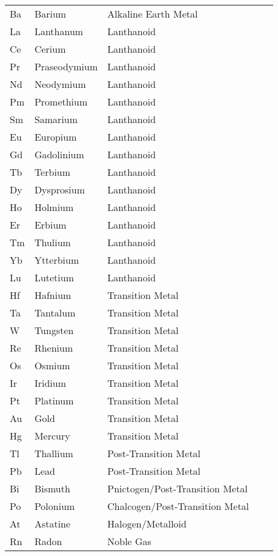 \begin{center}
\begin{longtable}{|l|l|l|l|l|}
Ba 	& Barium 		& Alkaline Earth Metal				& & \\
La 	& Lanthanum 	& Lanthanoid						& & \\
Ce 	& Cerium 		& Lanthanoid						& & \\
Pr 	& Praseodymium 	& Lanthanoid						& & \\
Nd 	& Neodymium 	& Lanthanoid						& & \\
Pm 	& Promethium	& Lanthanoid						& & \\
Sm 	& Samarium  	& Lanthanoid						& & \\
Eu 	& Europium  	& Lanthanoid						& & \\
Gd 	& Gadolinium	& Lanthanoid						& & \\
Tb 	& Terbium 		& Lanthanoid						& & \\
Dy 	& Dysprosium	& Lanthanoid						& & \\
Ho 	& Holmium   	& Lanthanoid						& & \\
Er 	& Erbium    	& Lanthanoid						& & \\
Tm 	& Thulium   	& Lanthanoid						& & \\
Yb 	& Ytterbium 	& Lanthanoid						& & \\
Lu 	& Lutetium  	& Lanthanoid						& & \\
Hf 	& Hafnium 		& Transition Metal					& & \\
Ta 	& Tantalum  	& Transition Metal					& & \\
W 	& Tungsten 		& Transition Metal					& & \\
Re 	& Rhenium 		& Transition Metal					& & \\
Os 	& Osmium 		& Transition Metal					& & \\
Ir 	& Iridium 		& Transition Metal					& & \\
Pt 	& Platinum 		& Transition Metal					& & \\
Au 	& Gold 			& Transition Metal					& & \\
Hg 	& Mercury 		& Transition Metal					& & \\
Tl 	& Thallium 		& Post-Transition Metal				& & \\
Pb 	& Lead 			& Post-Transition Metal				& & \\
Bi 	& Bismuth 		& Pnictogen/Post-Transition Metal	& & \\
Po 	& Polonium  	& Chalcogen/Post-Transition Metal	& & \\
At 	& Astatine  	& Halogen/Metalloid 				& & \\
Rn 	& Radon 		& Noble Gas 						& & \\

\end{longtable}
\end{center}

